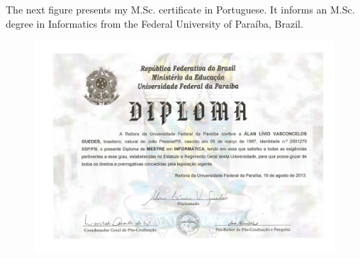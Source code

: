 \documentclass[10pt,a4paper,sans,colorlinks]{moderncv}
\begin{document}
The next figure presents my M.Sc. certificate in Portuguese.
It informs an M.Sc. degree in Informatics from the Federal University of Paraíba, Brazil.

\begin{figure}
    \centering
    \includegraphics[align=t,width=\textwidth,height=0.3\paperheight, keepaspectratio=true]{certificates/msc-certificate.pdf}
\end{figure}

\newpage
\end{document}

